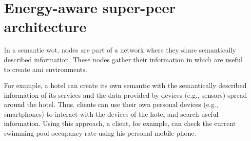 \section{Energy-aware super-peer architecture} %
\label{proposal}




In a semantic \ac{wot}, nodes are part of a network where they share semantically described information.
These nodes gather their information in \Spaces{} which are useful to create \ac{ami} environments.

For example, a hotel can create its own semantic \Space{} with the semantically described information of its services and the data provided by devices (e.g., sensors) spread around the hotel.
Thus, clients can use their own personal devices (e.g., smartphones) to interact with the devices of the hotel and search useful information.
Using this approach, a client, for example, can check the current swimming pool occupancy rate using his personal mobile phone.

